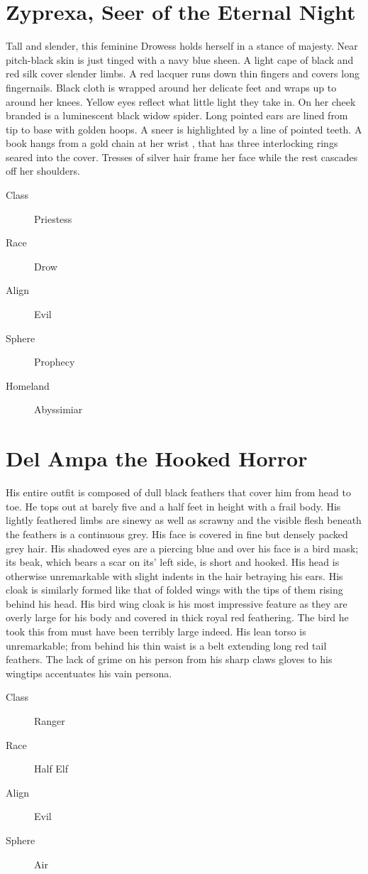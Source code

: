 \begin{multicols}{2}
\section{Zyprexa, Seer of the Eternal Night}
	Tall and slender, this feminine Drowess holds herself in a stance of majesty. Near pitch-black skin is just tinged with a navy blue sheen. A light cape of black and red silk cover slender limbs. A red lacquer runs down thin fingers and covers long fingernails. Black cloth is wrapped around her delicate feet and wraps up to around her knees. Yellow eyes reflect what little light they take in. On her cheek branded is a luminescent black widow spider. Long pointed ears are lined from tip to base with golden hoops. A sneer is highlighted by a line of pointed teeth. A book hangs from a gold chain at her wrist , that has three interlocking rings seared into the cover. Tresses of silver hair frame her face while the rest cascades off her shoulders.
\begin{description}
  \item[Class] Priestess
  \item[Race] Drow
  \item[Align] Evil
  \item[Sphere] Prophecy
  \item[Homeland] Abyssimiar
\end{description}

\section{Del Ampa the Hooked Horror}
	His entire outfit is composed of dull black feathers that cover him from head to toe. He tops out at barely five and a half feet in height with a frail body. His lightly feathered limbs are sinewy as well as scrawny and the visible flesh beneath the feathers is a continuous grey. His face is covered in fine but densely packed grey hair. His shadowed eyes are a piercing blue and over his face is a bird mask; its beak, which bears a scar on its' left side, is short and hooked. His head is otherwise unremarkable with slight indents in the hair betraying his ears. His cloak is similarly formed like that of folded wings with the tips of them rising behind his head. His bird wing cloak is his most impressive feature as they are overly large for his body and covered in thick royal red feathering. The bird he took this from must have been terribly large indeed. His lean torso is unremarkable; from behind his thin waist is a belt extending long red tail feathers. The lack of grime on his person from his sharp claws gloves to his wingtips accentuates his vain persona.
\begin{description}
  \item[Class] Ranger
  \item[Race] Half Elf
  \item[Align] Evil
  \item[Sphere] Air
\end{description}


\end{multicols}
